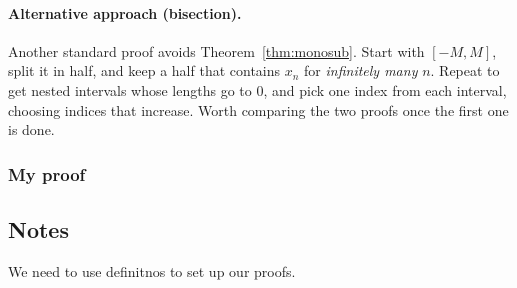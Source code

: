 \documentclass[11pt]{article}
\theoremstyle{definition}
\begin{document}
\paragraph{Alternative approach (bisection).}
Another standard proof avoids Theorem~\ref{thm:monosub}. Start with
$[-M,M]$, split it in half, and keep a half that contains $x_n$ for
\emph{infinitely many} $n$. Repeat to get nested intervals whose lengths
go to $0$, and pick one index from each interval, choosing indices that
increase. Worth comparing the two proofs once the first one is done.

\subsubsection*{My proof}


\subsection{Notes}
We need to use definitnos to set up our proofs.
\end{document}
